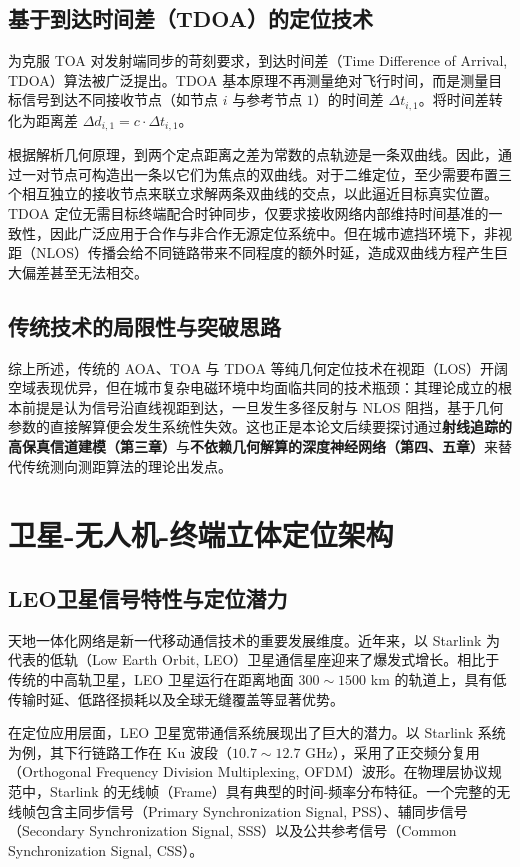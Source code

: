 \subsection{基于到达时间差（TDOA）的定位技术}

为克服 TOA 对发射端同步的苛刻要求，到达时间差（Time Difference of Arrival, TDOA）算法被广泛提出。TDOA 基本原理不再测量绝对飞行时间，而是测量目标信号到达不同接收节点（如节点 $i$ 与参考节点 $1$）的时间差 $\Delta t_{i,1}$。将时间差转化为距离差 $\Delta d_{i,1} = c \cdot \Delta t_{i,1}$。

根据解析几何原理，到两个定点距离之差为常数的点轨迹是一条双曲线。因此，通过一对节点可构造出一条以它们为焦点的双曲线。对于二维定位，至少需要布置三个相互独立的接收节点来联立求解两条双曲线的交点，以此逼近目标真实位置。TDOA 定位无需目标终端配合时钟同步，仅要求接收网络内部维持时间基准的一致性，因此广泛应用于合作与非合作无源定位系统中。但在城市遮挡环境下，非视距（NLOS）传播会给不同链路带来不同程度的额外时延，造成双曲线方程产生巨大偏差甚至无法相交。

\subsection{传统技术的局限性与突破思路}

综上所述，传统的 AOA、TOA 与 TDOA 等纯几何定位技术在视距（LOS）开阔空域表现优异，但在城市复杂电磁环境中均面临共同的技术瓶颈：其理论成立的根本前提是认为信号沿直线视距到达，一旦发生多径反射与 NLOS 阻挡，基于几何参数的直接解算便会发生系统性失效。这也正是本论文后续要探讨通过\textbf{射线追踪的高保真信道建模（第三章）}与\textbf{不依赖几何解算的深度神经网络（第四、五章）}来替代传统测向测距算法的理论出发点。

\section{卫星-无人机-终端立体定位架构}

\subsection{LEO卫星信号特性与定位潜力}

天地一体化网络是新一代移动通信技术的重要发展维度。近年来，以 Starlink 为代表的低轨（Low Earth Orbit, LEO）卫星通信星座迎来了爆发式增长。相比于传统的中高轨卫星，LEO 卫星运行在距离地面 $300 \sim 1500$ km 的轨道上，具有低传输时延、低路径损耗以及全球无缝覆盖等显著优势。

在定位应用层面，LEO 卫星宽带通信系统展现出了巨大的潜力。以 Starlink 系统为例，其下行链路工作在 Ku 波段（$10.7 \sim 12.7$ GHz），采用了正交频分复用（Orthogonal Frequency Division Multiplexing, OFDM）波形。在物理层协议规范中，Starlink 的无线帧（Frame）具有典型的时间-频率分布特征。一个完整的无线帧包含主同步信号（Primary Synchronization Signal, PSS）、辅同步信号（Secondary Synchronization Signal, SSS）以及公共参考信号（Common Synchronization Signal, CSS）。

